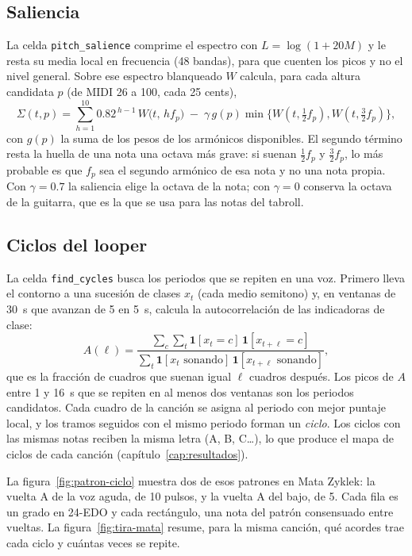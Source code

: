 \subsection{Saliencia}

La celda \texttt{pitch\_salience} comprime el espectro con $L = \log(1 + 20 M)$ y le resta su media local en frecuencia
(48 bandas), para que cuenten los picos y no el nivel general. Sobre ese espectro blanqueado $W$ calcula, para cada altura
candidata $p$ (de MIDI 26 a 100, cada 25 cents),
\[
  \Sigma(t, p) = \sum_{h=1}^{10} 0.82^{\,h-1}\, W\bigl(t,\, h f_p\bigr) \;-\; \gamma\, g(p) \min\bigl\{W(t, \tfrac12 f_p),
  W(t, \tfrac32 f_p)\bigr\},
\]
con $g(p)$ la suma de los pesos de los armónicos disponibles. El segundo término resta la huella de una nota una octava
más grave: si suenan $\tfrac12 f_p$ y $\tfrac32 f_p$, lo más probable es que $f_p$ sea el segundo armónico de esa nota y no
una nota propia. Con $\gamma = 0.7$ la saliencia elige la octava de la nota; con $\gamma = 0$ conserva la octava de la
guitarra, que es la que se usa para las notas del tabroll.

\subsection{Ciclos del looper}\label{sec:met-ciclos}

La celda \texttt{find\_cycles} busca los periodos que se repiten en una voz. Primero lleva el contorno a una sucesión de
clases $x_t$ (cada medio semitono) y, en ventanas de 30~s que avanzan de 5 en 5~s, calcula la autocorrelación de las
indicadoras de clase:
\[
  A(\ell) = \frac{\sum_c \sum_t \mathbf{1}[x_t = c]\, \mathbf{1}[x_{t+\ell} = c]}{\sum_t \mathbf{1}[x_t \text{ sonando}]\,
  \mathbf{1}[x_{t+\ell} \text{ sonando}]},
\]
que es la fracción de cuadros que suenan igual $\ell$ cuadros después. Los picos de $A$ entre 1 y 16~s que se repiten en
al menos dos ventanas son los periodos candidatos. Cada cuadro de la canción se asigna al periodo con mejor puntaje local,
y los tramos seguidos con el mismo periodo forman un \emph{ciclo}. Los ciclos con las mismas notas reciben la misma letra
(A, B, C\dots), lo que produce el mapa de ciclos de cada canción (capítulo~\ref{cap:resultados}).

La figura~\ref{fig:patron-ciclo} muestra dos de esos patrones en Mata Zyklek: la vuelta A de la voz aguda, de 10 pulsos,
y la vuelta A del bajo, de 5. Cada fila es un grado en 24-EDO y cada rectángulo, una nota del patrón consensuado entre
vueltas. La figura~\ref{fig:tira-mata} resume, para la misma canción, qué acordes trae cada ciclo y cuántas veces se
repite.

